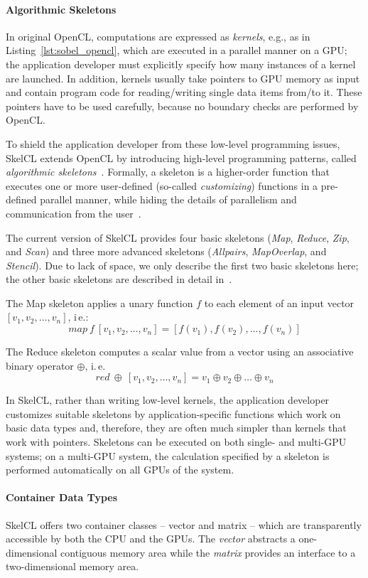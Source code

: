 \paragraph{Algorithmic Skeletons}
In original OpenCL, computations are expressed as \emph{kernels}, e.g., as in Listing~\ref{lst:sobel_opencl},  which are executed in a parallel manner on a GPU; the application developer must explicitly specify how many instances of a kernel are launched.
In addition, kernels usually take pointers to GPU memory as input and contain program code for reading/writing single data items from/to it.
These pointers have to be used carefully, because no boundary checks are performed by OpenCL.

To shield the application developer from these low-level programming issues, SkelCL extends OpenCL by introducing high-level programming patterns, called \emph{algorithmic skeletons}~\cite{GoC-11}.
Formally, a skeleton is a higher-order function that executes one or more user-defined (so-called \emph{customizing}) functions in a pre-defined parallel manner, while hiding the details of parallelism and communication from the user~\cite{GoC-11}.

The current version of SkelCL provides four basic skeletons (\emph{Map}, \emph{Reduce}, \emph{Zip}, and \emph{Scan}) and three more advanced skeletons (\emph{Allpairs}, \emph{MapOverlap}, and \emph{Stencil}).
Due to lack of space, we only describe the first two basic skeletons here;
the other basic skeletons are described in detail in~\cite{StG-13b}.

The Map skeleton applies a unary function $f$ to each element of an input vector $[v_1, v_2, \dots, v_n]$, i\,e.:
    \[ map\ f\ [v_1, v_2, \dots, v_n] = [f(v_1), f(v_2), \dots, f(v_n)] \]

The Reduce skeleton computes a scalar value from a vector using an associative binary operator $\oplus$, i.\,e.
    \[ red\ \oplus\ [v_1, v_2, \dots, v_n] = v_1 \oplus v_2 \oplus \dots \oplus v_n \]

In SkelCL, rather than writing low-level kernels, the application developer
customizes suitable skeletons by application-specific functions which work
on basic data types and, therefore, they are often much simpler than kernels that work with pointers.
Skeletons can be executed on both single- and multi-GPU systems;
on a multi-GPU system, the calculation specified by a skeleton is performed automatically on all GPUs of the system.

\paragraph{Container Data Types}
SkelCL offers two container classes -- vector and matrix -- which are transparently accessible by both the CPU and the GPUs.
The \emph{vector} abstracts a one-dimensional contiguous memory area while the \emph{matrix} provides an interface to a two-dimensional memory area.


